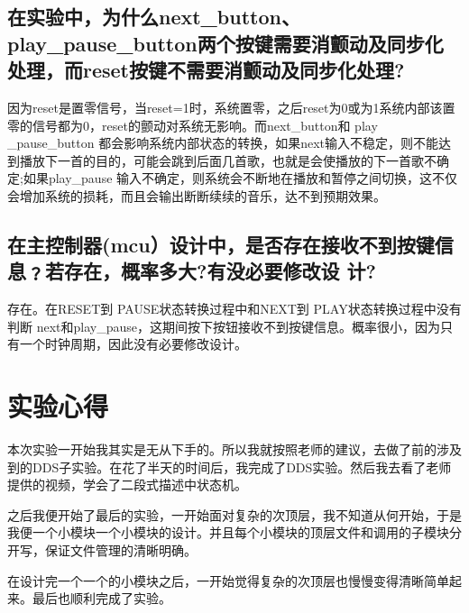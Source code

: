 \documentclass{../source/Experiment}
\begin{document}
        \subsection{在实验中，为什么next\_button、play\_pause\_button两个按键需要消颤动及同步化处理，而reset按键不需要消颤动及同步化处理?}
        因为reset是置零信号，当reset=1时，系统置零，之后reset为0或为1系统内部该置零的信号都为0，reset的颤动对系统无影响。而next\_button和 play \_pause\_button 都会影响系统内部状态的转换，如果next输入不稳定，则不能达到播放下一首的目的，可能会跳到后面几首歌，也就是会使播放的下一首歌不确定;如果play\_pause 输入不确定，则系统会不断地在播放和暂停之间切换，这不仅会增加系统的损耗，而且会输出断断续续的音乐，达不到预期效果。
        \subsection{在主控制器(mcu）设计中，是否存在接收不到按键信息﹖若存在，概率多大?有没必要修改设
        计?}
        存在。在RESET到 PAUSE状态转换过程中和NEXT到 PLAY状态转换过程中没有判断 next和play\_pause，这期间按下按钮接收不到按键信息。概率很小，因为只有一个时钟周期，因此没有必要修改设计。
    
    \section{实验心得}
    本次实验一开始我其实是无从下手的。所以我就按照老师的建议，去做了前的涉及到的DDS子实验。在花了半天的时间后，我完成了DDS实验。然后我去看了老师提供的视频，学会了二段式描述中状态机。

    之后我便开始了最后的实验，一开始面对复杂的次顶层，我不知道从何开始，于是我便一个小模块一个小模块的设计。并且每个小模块的顶层文件和调用的子模块分开写，保证文件管理的清晰明确。

    在设计完一个一个的小模块之后，一开始觉得复杂的次顶层也慢慢变得清晰简单起来。最后也顺利完成了实验。
\end{document}
